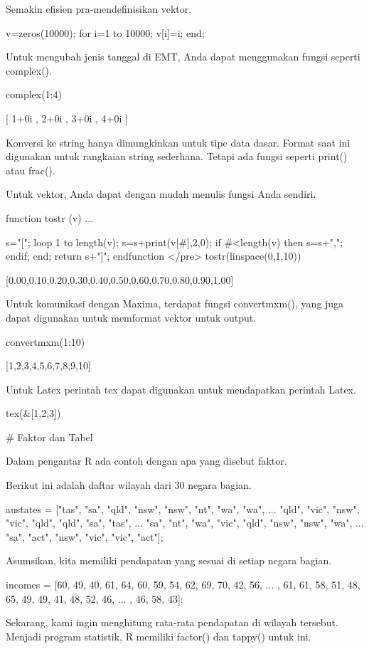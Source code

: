 \documentclass{article}
\begin{document}
Semakin efisien pra-mendefinisikan vektor.


\>v=zeros(10000); for i=1 to 10000; v[i]=i; end;


Untuk mengubah jenis tanggal di EMT, Anda dapat menggunakan fungsi
seperti complex().


\>complex(1:4)


    [ 1+0i ,  2+0i ,  3+0i ,  4+0i  ]

Konversi ke string hanya dimungkinkan untuk tipe data dasar. Format
saat ini digunakan untuk rangkaian string sederhana. Tetapi ada fungsi
seperti print() atau frac().


Untuk vektor, Anda dapat dengan mudah menulis fungsi Anda sendiri.


\>function tostr (v) ...


    s="[";
    loop 1 to length(v);
       s=s+print(v[#],2,0);
       if #<length(v) then s=s+","; endif;
    end;
    return s+"]";
    endfunction
</pre>
\>tostr(linspace(0,1,10))


    [0.00,0.10,0.20,0.30,0.40,0.50,0.60,0.70,0.80,0.90,1.00]

Untuk komunikasi dengan Maxima, terdapat fungsi convertmxm(), yang
juga dapat digunakan untuk memformat vektor untuk output.


\>convertmxm(1:10)


    [1,2,3,4,5,6,7,8,9,10]

Untuk Latex perintah tex dapat digunakan untuk mendapatkan perintah
Latex.


\>tex(&[1,2,3])


    \left[ 1 , 2 , 3 \right] 

# Faktor dan Tabel

Dalam pengantar R ada contoh dengan apa yang disebut faktor.


Berikut ini adalah daftar wilayah dari 30 negara bagian.


\>austates = ["tas", "sa", "qld", "nsw", "nsw", "nt", "wa", "wa", ...  
\>   "qld", "vic", "nsw", "vic", "qld", "qld", "sa", "tas", ...  
\>   "sa", "nt", "wa", "vic", "qld", "nsw", "nsw", "wa", ...  
\>   "sa", "act", "nsw", "vic", "vic", "act"];


Asumsikan, kita memiliki pendapatan yang sesuai di setiap negara
bagian.


\>incomes = [60, 49, 40, 61, 64, 60, 59, 54, 62, 69, 70, 42, 56, ...  
, 61, 61, 58, 51, 48, 65, 49, 49, 41, 48, 52, 46, ...  
, 46, 58, 43];


Sekarang, kami ingin menghitung rata-rata pendapatan di wilayah
tersebut. Menjadi program statistik, R memiliki factor() dan tappy()
untuk ini.
\end{document}

